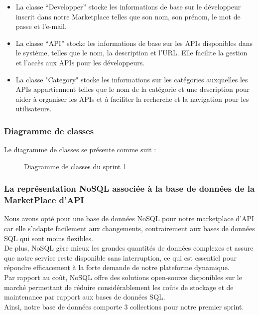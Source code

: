         \begin{itemize}
            \item La classe “Developper” stocke les informations de base sur le développeur inscrit dans notre Marketplace telles que son nom, son prénom, le mot de passe et l'e-mail.
            \item La classe “API” stocke les informations de base sur les APIs disponibles dans le système, telles que le nom, la description et l'URL. Elle facilite la gestion et l'accès aux APIs pour les développeurs.
            \item La classe "Category" stocke les informations sur les catégories auxquelles les APIs appartiennent telles que le nom de la catégorie et une description pour aider à organiser les APIs et à faciliter la recherche et la navigation pour les utilisateurs.
        \end{itemize}
    \pagebreak

        \subsubsection{Diagramme de classes}
        Le diagramme de classes se présente comme suit :
        \begin{figure}[H]
            \centering
            \caption{ Diagramme de classes du sprint 1 }
            \label{fig:logo_tt}
        \end{figure}

        \subsubsection{La représentation NoSQL associée à la base de données de la MarketPlace d’API}
        Nous avons opté pour une base de données NoSQL pour notre marketplace d’API car elle s’adapte facilement aux changements, contrairement aux bases de données SQL qui sont moins flexibles. \\
        De plus, NoSQL gère mieux les grandes quantités de données complexes et assure que notre service reste disponible sans interruption, ce qui est essentiel pour répondre efficacement à la forte demande de notre plateforme dynamique.\\
        Par rapport au coût, NoSQL offre des solutions open-source disponibles sur le marché permettant de réduire considérablement les coûts de stockage et de maintenance par rapport aux bases de données SQL.\\
        Ainsi, notre base de données comporte 3 collections pour notre premier sprint. \\
    \pagebreak

